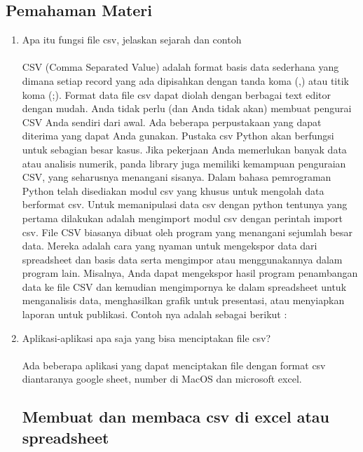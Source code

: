 \subsection{Pemahaman Materi}
\begin{enumerate}
\item Apa itu fungsi ﬁle csv, jelaskan sejarah dan contoh
\paragraph{} CSV (Comma Separated Value) adalah format basis data sederhana yang dimana setiap record yang ada dipisahkan dengan tanda koma (,) atau titik koma (;). Format data file csv dapat diolah dengan berbagai text editor dengan mudah. Anda tidak perlu (dan Anda tidak akan) membuat pengurai CSV Anda sendiri dari awal. Ada beberapa perpustakaan yang dapat diterima yang dapat Anda gunakan. Pustaka csv Python akan berfungsi untuk sebagian besar kasus. Jika pekerjaan Anda memerlukan banyak data atau analisis numerik, panda library juga memiliki kemampuan penguraian CSV, yang seharusnya menangani sisanya. Dalam bahasa pemrograman Python telah disediakan modul csv yang khusus untuk mengolah data berformat csv.  Untuk memanipulasi data csv dengan python tentunya yang pertama dilakukan adalah mengimport modul csv dengan perintah import csv. File CSV biasanya dibuat oleh program yang menangani sejumlah besar data. Mereka adalah cara yang nyaman untuk mengekspor data dari spreadsheet dan basis data serta mengimpor atau menggunakannya dalam program lain. Misalnya, Anda dapat mengekspor hasil program penambangan data ke file CSV dan kemudian mengimpornya ke dalam spreadsheet untuk menganalisis data, menghasilkan grafik untuk presentasi, atau menyiapkan laporan untuk publikasi. Contoh nya adalah sebagai berikut :

 

\item Aplikasi-aplikasi apa saja yang bisa menciptakan ﬁle csv?
\paragraph{} Ada beberapa aplikasi yang dapat menciptakan file dengan format csv diantaranya google sheet, number di MacOS dan microsoft excel.
\subsection{Membuat dan membaca csv di excel atau spreadsheet}


\end{enumerate}

